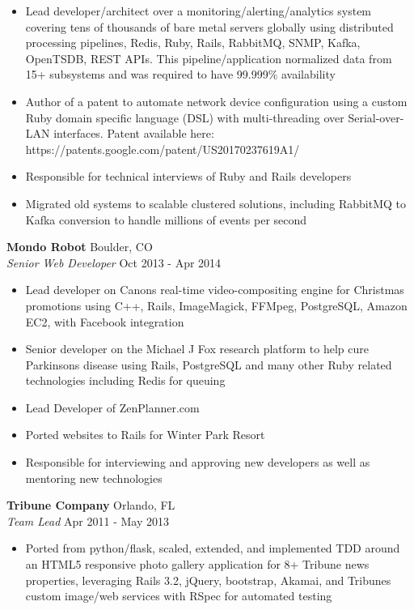 \documentclass[a4paper]{article}
\begin{document}
{\begin{itemize}
\vspace{-1mm}
	\item Lead developer/architect over a monitoring/alerting/analytics system covering tens of thousands of bare metal servers globally using distributed processing pipelines, Redis, Ruby, Rails, RabbitMQ, SNMP, Kafka, OpenTSDB, REST APIs. This pipeline/application normalized data from 15+ subsystems and was required to have 99.999\% availability
\newpage
	\item Author of a patent to automate network device configuration using a custom Ruby domain specific language (DSL) with multi-threading over Serial-over-LAN interfaces. Patent available here: https://patents.google.com/patent/US20170237619A1/
	\item Responsible for technical interviews of Ruby and Rails developers
	\item Migrated old systems to scalable clustered solutions, including RabbitMQ to Kafka conversion to handle millions of events per second
\end{itemize}
\textbf{Mondo Robot} \hfill Boulder, CO\\
\textit{Senior Web Developer} \hfill Oct 2013 - Apr 2014\\
\vspace{-1mm}
\begin{itemize} \itemsep 1pt
	\item Lead developer on Canon\textquotesingle{}s real-time video-compositing engine for Christmas promotions using C++, Rails, ImageMagick, FFMpeg, PostgreSQL, Amazon EC2, with Facebook integration
	\item Senior developer on the Michael J Fox research platform to help cure Parkinson\textquotesingle{}s disease using Rails, PostgreSQL and many other Ruby related technologies including Redis for queuing
	\item Lead Developer of ZenPlanner.com
	\item Ported websites to Rails for Winter Park Resort
	\item Responsible for interviewing and approving new developers as well as mentoring new technologies
\end{itemize}
\textbf{Tribune Company} \hfill Orlando, FL\\
\textit{Team Lead} \hfill Apr 2011 - May 2013\\
\vspace{-1mm}
\begin{itemize} \itemsep 1pt
	\item Ported from python/flask, scaled, extended, and implemented TDD around an HTML5 responsive photo gallery application for 8+ Tribune news properties, leveraging Rails 3.2, jQuery, bootstrap, Akamai, and Tribune\textquotesingle{}s custom image/web services with RSpec for automated testing

\end{itemize}}
\end{document}

